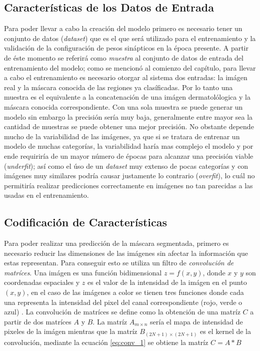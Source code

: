 \subsection{Características de los Datos de Entrada}
Para poder llevar a cabo la creación del modelo primero es necesario tener un conjunto de datos (\emph{dataset}) que es el que será utilizado para el entrenamiento y la validación de la configuración de pesos sinápticos en la época presente.
A partir de éste momento se referirá como \emph{muestra} al conjunto de datos de entrada del entrenamiento del modelo; como se mencionó al comienzo del capítulo, para llevar a cabo el entrenamiento es necesario otorgar al sistema dos entradas: la imágen real y la máscara conocida de las regiones ya clasíficadas. Por lo tanto una muestra es el equivalente a la concatenación de una imágen dermatolólogica y la máscara conocida correspondiente. Con una sola muestra se puede generar un modelo sin embargo la precisión sería muy baja, generalmente entre mayor sea la cantidad de muestras se puede obtener una mejor precisión. No obstante depende mucho de la variabilidad de las imágenes, ya que si se tratara de entrenar un modelo de muchas categorías, la variabilidad haría mas complejo el modelo y por ende requiriría de un mayor número de épocas para alcanzar una precisión viable (\emph{underfit}); así como el úso de un \emph{dataset} muy extenso de pocas categorías y con imágenes muy similares podría causar justamente lo contrario (\emph{overfit}), lo cuál no permitiría realizar predicciones correctamente en imágenes no tan parecidas a las usadas en el entrenamiento.


\subsection{Codificación de Características}
Para poder realizar una predicción de la máscara segmentada, primero es necesario reducir las dimensiones de las imágenes sin afectar la información que estas representan. Para conseguir esto se utiliza un filtro de \emph{convolución de matríces}. Una imágen es una función bidimensional $ z = f(x,y)$, donde $x$ y $y$ son coordenadas espaciales y $z$ es el valor de la intensidad de la imágen en el punto $(x , y)$, en el caso de las imágenes a color se tienen tres funciones donde cada una representa la intensidad del pixel del canal correspondiente (rojo, verde o azul) \citep[~p. 100]{conv_1}. La convolución de matríces se define como la obtención de una matríz $C$ a partir de dos matríces $A$ y $B$. La matríz $A_{m \times n}$ sería el mapa de intensidad de pixeles de la imágen mientras que la matríz $B_{(2N+1) \times (2N+1)}$ es el kernel de la convolución, mediante la ecuación \ref{eq:conv_1} se obtiene la matríz $C = A * B$


